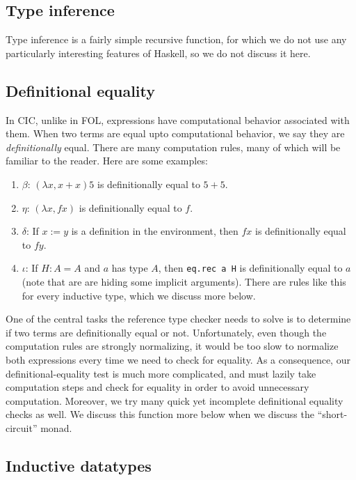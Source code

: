 \documentclass{article}
\begin{document}
\begin{spacing}{1.1}
\subsection{Type inference}

Type inference is a fairly simple recursive function, for which we do not use any particularly interesting features of Haskell, so we do not discuss it here.

\subsection{Definitional equality}

In CIC, unlike in FOL, expressions have computational behavior associated with them. When two terms are equal upto computational behavior, we say they are \emph{definitionally} equal. There are many computation rules, many of which will be familiar to the reader. Here are some examples:
\begin{enumerate}
\item \( \beta \): \( (\lambda x, x + x) 5 \) is definitionally equal to \( 5 + 5 \).
\item \( \eta \): \( (\lambda x, f x) \) is definitionally equal to \( f \).
\item \( \delta \): If \( x := y \) is a definition in the environment, then \( f x \) is definitionally equal to \( f y \).
\item \( \iota \): If \( H : A = A \) and \( a \) has type \( A \), then \lstinline{eq.rec a H} is definitionally equal to \( a \) (note that are are hiding some implicit arguments). There are rules like this for every inductive type, which we discuss more below.
\end{enumerate}

One of the central tasks the reference type checker needs to solve is to determine if two terms are definitionally equal or not. Unfortunately, even though the computation rules are strongly normalizing, it would be too slow to normalize both expressions every time we need to check for equality. As a consequence, our definitional-equality test is much more complicated, and must lazily take computation steps and check for equality in order to avoid unnecessary computation. Moreover, we try many quick yet incomplete definitional equality checks as well. We discuss this function more below when we discuss the ``short-circuit'' monad.

\subsection{Inductive datatypes}


\end{spacing}
\end{document}
